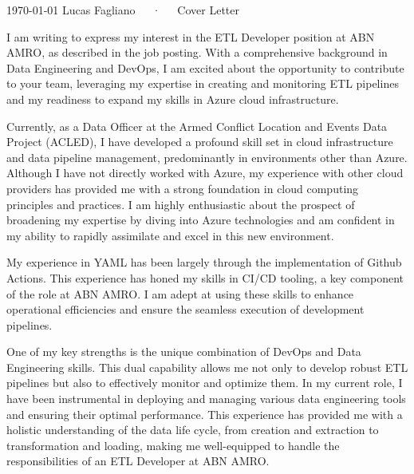 \documentclass[11pt, a4paper]{awesome-cv}
\begin{document}
\makecvheader[R]

\makecvfooter
  {\today}
  {Lucas Fagliano~~~·~~~Cover Letter}
  {\thepage}

\makelettertitle

\begin{cvletter}

I am writing to express my interest in the ETL Developer position at ABN AMRO, as described in the job posting. With a comprehensive background in Data Engineering and DevOps, I am excited about the opportunity to contribute to your team, leveraging my expertise in creating and monitoring ETL pipelines and my readiness to expand my skills in Azure cloud infrastructure.

Currently, as a Data Officer at the Armed Conflict Location and Events Data Project (ACLED), I have developed a profound skill set in cloud infrastructure and data pipeline management, predominantly in environments other than Azure. Although I have not directly worked with Azure, my experience with other cloud providers has provided me with a strong foundation in cloud computing principles and practices. I am highly enthusiastic about the prospect of broadening my expertise by diving into Azure technologies and am confident in my ability to rapidly assimilate and excel in this new environment.

My experience in YAML has been largely through the implementation of Github Actions. This experience has honed my skills in CI/CD tooling, a key component of the role at ABN AMRO. I am adept at using these skills to enhance operational efficiencies and ensure the seamless execution of development pipelines.

One of my key strengths is the unique combination of DevOps and Data Engineering skills. This dual capability allows me not only to develop robust ETL pipelines but also to effectively monitor and optimize them. In my current role, I have been instrumental in deploying and managing various data engineering tools and ensuring their optimal performance. This experience has provided me with a holistic understanding of the data life cycle, from creation and extraction to transformation and loading, making me well-equipped to handle the responsibilities of an ETL Developer at ABN AMRO.


\end{cvletter}
\end{document}

